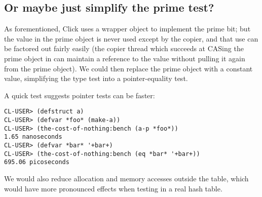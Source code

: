 \documentclass{article}
\begin{document}
\subsection{Or maybe just simplify the prime test?}

As forementioned, Click uses a wrapper object to implement the prime
bit; but the value in the prime object is never used except by the
copier, and that use can be factored out fairly easily (the copier
thread which succeeds at CASing the prime object in can maintain a
reference to the value without pulling it again from the prime
object). We could then replace the prime object with a constant value,
simplifying the type test into a pointer-equality test.

A quick test suggests pointer tests can be faster:

\begin{verbatim}
CL-USER> (defstruct a)
CL-USER> (defvar *foo* (make-a))
CL-USER> (the-cost-of-nothing:bench (a-p *foo*))
1.65 nanoseconds
CL-USER> (defvar *bar* '+bar+)
CL-USER> (the-cost-of-nothing:bench (eq *bar* '+bar+))
695.06 picoseconds
\end{verbatim}

We would also reduce allocation and memory accesses outside the table,
which would have more pronounced effects when testing in a real hash
table.
\end{document}
